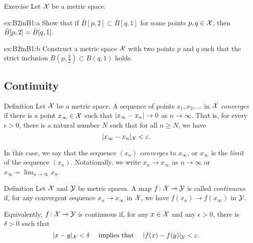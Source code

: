 \begin{thm}{Exercise}\label{ex:B2inB1}
Let $\mathcal{X}$ be a metric space.

\begin{subthm}{ex:B2inB1:a}
Show that if $\bar B[p,2]\subset \bar B[q,1]$ for some points $p,q\in \mathcal{X}$, then $\bar B[p,2]\z=\bar B[q,1]$.
\end{subthm}

\begin{subthm}{ex:B2inB1:b} Construct a metric space $\mathcal{X}$ with two points $p$ and $q$ such that the strict inclusion
$B(p,\tfrac32)\subset B(q,1)$ holds.
\end{subthm}

\end{thm}



\subsection*{Continuity}

\begin{thm}{Definition}
 Let ${\mathcal{X}}$ be a metric space.
A sequence of points $x_1, x_2, \ldots$ in ${\mathcal{X}}$ \emph{converges}
if there is a point
$x_\infty\in {\mathcal{X}}$ such that $\dist{x_\infty}{x_n}{}\to 0$ as $n\to\infty$.  
That is, for every $\epsilon > 0$, there is a natural number $N$ such that for all $n \ge N$, we have
\[
\dist{x_\infty}{x_n}{\spc{X}}
<
\epsilon.
\]

In this case, we say that the sequence $(x_n)$ {}\emph{converges} to $x_\infty$, 
or $x_\infty$ is the {}\emph{limit} of the sequence $(x_n)$.
Notationally, we write $x_n\to x_\infty$ as $n\to\infty$
or $x_\infty=\lim_{n\to\infty} x_n$.
\end{thm}

\begin{thm}{Definition}\label{def:continuous}
Let $\mathcal{X}$ and $\mathcal{Y}$ be metric spaces.
A map $f\colon\mathcal{X}\to \mathcal{Y}$ is called \emph{continuous} if, for any convergent sequence $x_n\to x_\infty$ in ${\mathcal{X}}$,
we have $f(x_n) \to f(x_\infty)$ in $\mathcal{Y}$.

Equivalently, $f\colon\mathcal{X}\to \mathcal{Y}$ is continuous if, for any $x\in {\mathcal{X}}$ and any $\epsilon>0$,
there is $\delta>0$ such that 
$$\dist{x}{y}{\spc{X}}<\delta\quad \text{ implies that }\quad \dist{f(x)}{f(y)}{\spc{Y}}<\epsilon.$$

\end{thm}

